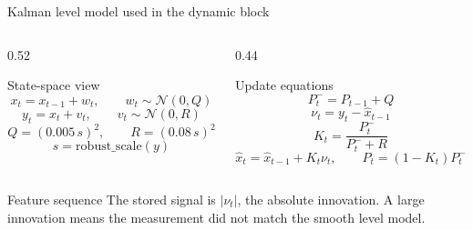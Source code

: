 \documentclass[10pt,aspectratio=169]{beamer}
\begin{document}
\begin{frame}{Kalman level model used in the dynamic block}
\small
\begin{columns}[T,totalwidth=\textwidth]
\begin{column}{0.52\textwidth}
\begin{block}{State-space view}
\[
x_t=x_{t-1}+w_t,\qquad w_t\sim\mathcal{N}(0,Q)
\]
\[
y_t=x_t+v_t,\qquad v_t\sim\mathcal{N}(0,R)
\]
\[
Q=(0.005\,s)^2,\qquad R=(0.08\,s)^2
\]
\[
s=\mathrm{robust\_scale}(y)
\]
\end{block}
\end{column}
\begin{column}{0.44\textwidth}
\begin{alertblock}{Update equations}
\[
P_t^- = P_{t-1}+Q
\]
\[
\nu_t=y_t-\hat{x}_{t-1}
\]
\[
K_t=\frac{P_t^-}{P_t^-+R}
\]
\[
\hat{x}_t=\hat{x}_{t-1}+K_t\nu_t,\qquad
P_t=(1-K_t)P_t^-
\]
\end{alertblock}
\end{column}
\end{columns}
\vspace{1mm}
\begin{exampleblock}{Feature sequence}
The stored signal is $|\nu_t|$, the absolute innovation. A large innovation means the measurement did not match the smooth level model.
\end{exampleblock}
\end{frame}
\end{document}
